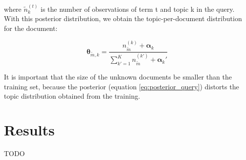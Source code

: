 \documentclass{article}
\begin{document}
where $\tilde{n}_k ^{(t)}$ is the number of observations of term t and topic k in the query. With this posterior distribution, we obtain the topic-per-document distribution for the document:

\begin{equation}
\bm{\theta}_{\tilde{m},k} = \frac{n_{\tilde{m}}^{(k)} + \bm{\alpha}_k}{\sum_{k'=1}^K n_{\tilde{m}}^{(k')} + \bm{\alpha}_k'}
\end{equation}

It is important that the size of the unknown documents be smaller than the training set, because the posterior (equation \ref{eq:posterior_query}) distorts the topic distribution obtained from the training.

\section{Results}
TODO

\nocite{blei2012probabilistic}



\end{document}
